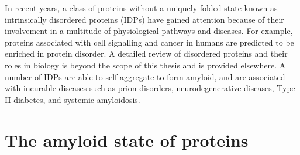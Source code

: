 In recent years, a class of proteins without a uniquely folded state known as intrinsically disordered proteins (IDPs) have gained attention because of their involvement in a multitude of physiological pathways and diseases.\cite{Sigalov:2010p7619} For example, proteins associated with cell signalling and cancer in humans are predicted to be enriched in protein disorder.\cite{Dunker:2002ex}
A detailed review of disordered proteins and their roles in biology is beyond the scope of this thesis and is provided elsewhere.\cite{Rauscher:2010p5682,Uversky:2008gh} A number of IDPs are able to self-aggregate to form amyloid, and are associated with incurable diseases such as prion disorders, neurodegenerative diseases, Type II diabetes, and systemic amyloidosis.\cite{Chiti:2006fz}




\section{The amyloid state of proteins}
\label{sec:amyloid}

